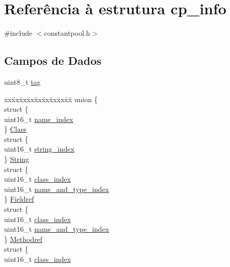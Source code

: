 \hypertarget{structcp__info}{}\section{Referência à estrutura cp\+\_\+info}
\label{structcp__info}


{\ttfamily \#include $<$constantpool.\+h$>$}

\subsection*{Campos de Dados}
\begin{DoxyCompactItemize}
\item 
uint8\+\_\+t \hyperlink{structcp__info_a29d87595bc993eb6cd53f30e8305ec74}{tag}
\item 
\begin{tabbing}
xx\=xx\=xx\=xx\=xx\=xx\=xx\=xx\=xx\=\kill
union \{\\
\>struct \{\\
\>\>uint16\_t \hyperlink{structcp__info_a3c8912fe67e7d3f9ce150aa6f5bec22d}{name\_index}\\
\>\} \hyperlink{structcp__info_aeb14fdcb3ba2363a18f2ecbeac15ac41}{Class}\\
\>struct \{\\
\>\>uint16\_t \hyperlink{structcp__info_aa63dfc7668d7eff682f88b09c48eddc8}{string\_index}\\
\>\} \hyperlink{structcp__info_a0e7c2a98e0cf4ffeb32047c7d78d835c}{String}\\
\>struct \{\\
\>\>uint16\_t \hyperlink{structcp__info_ab2b48e96f2178c47f9f6b683c9b2fc59}{class\_index}\\
\>\>uint16\_t \hyperlink{structcp__info_ad7a8733b3b078818a59cc33eb1fa7dc3}{name\_and\_type\_index}\\
\>\} \hyperlink{structcp__info_ac2cdad99f486a8e1bd1a66a06556a945}{Fieldref}\\
\>struct \{\\
\>\>uint16\_t \hyperlink{structcp__info_ab2b48e96f2178c47f9f6b683c9b2fc59}{class\_index}\\
\>\>uint16\_t \hyperlink{structcp__info_ad7a8733b3b078818a59cc33eb1fa7dc3}{name\_and\_type\_index}\\
\>\} \hyperlink{structcp__info_a3a2f2fccc08f122c44a2cd3405ee6264}{Methodref}\\
\>struct \{\\
\>\>uint16\_t \hyperlink{structcp__info_ab2b48e96f2178c47f9f6b683c9b2fc59}{class\_index}\\

\end{tabbing}
\end{DoxyCompactItemize}

